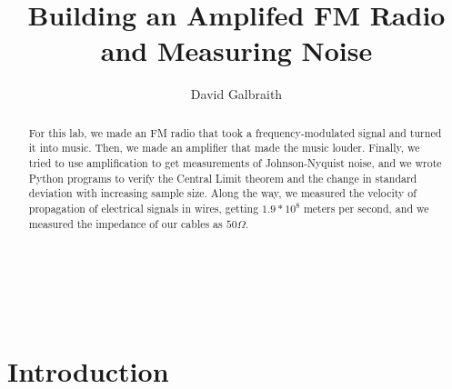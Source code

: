 \documentclass[11pt]{article}
\begin{document}
\title{Building an Amplifed FM Radio and Measuring Noise}
\author{David Galbraith}
\maketitle

\normalsize
\begin{abstract}
For this lab, we made an FM radio that took a frequency-modulated signal and turned it
into music. Then, we made an amplifier that made the music louder. Finally, we tried to use
amplification to get measurements of Johnson-Nyquist noise, and we wrote Python programs
to verify the Central Limit theorem and the change in standard deviation with
increasing sample size. Along the way, we measured the velocity of propagation of 
electrical signals in wires, getting $1.9*10^8$ meters per second, and we measured the impedance
of our cables as $50 \Omega$. 
\end{abstract}


\medskip                        %

\thispagestyle{plain}
 

\section{Introduction}
\end{document}
